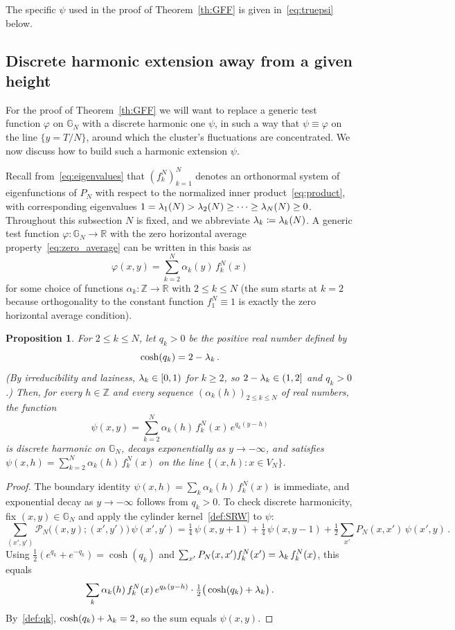 \documentclass[11pt,a4paper,reqno]{amsart}
\newtheorem{Proposition}[Theorem]{Proposition}
\theoremstyle{definition}
\newcommand{\cP}{\ensuremath{\mathcal P}}
\newcommand{\bbG}{{\ensuremath{\mathbb G}} }
\newcommand{\bbR}{{\ensuremath{\mathbb R}} }
\newcommand{\bbZ}{{\ensuremath{\mathbb Z}} }
\let\a=\alpha \let\b=\beta   \let\d=\delta  \let\e=\varepsilon
\begin{document}
The specific $\psi$ used in the proof of Theorem~\ref{th:GFF} is given in~\eqref{eq:truepsi} below.

\subsection{Discrete harmonic extension away from a given height}
For the proof of Theorem~\ref{th:GFF} we will want to replace a generic test function $\varphi$ on $\bbG_N$ with a discrete harmonic one $\psi$, in such a way that $\psi \equiv \varphi$ on the line $\{y = T/N\}$, around which the cluster's fluctuations are concentrated. We now discuss how to build such a harmonic extension $\psi$.  



Recall from~\eqref{eq:eigenvalues} that $(f_k^N)_{k=1}^N$ denotes an orthonormal system of eigenfunctions of $P_N$ with respect to the normalized inner product~\eqref{eq:product}, with corresponding eigenvalues $1 = \lambda_1(N) > \lambda_2(N) \geq \cdots \geq \lambda_N(N) \geq 0$. Throughout this subsection $N$ is fixed, and we abbreviate $\lambda_k \coloneqq \lambda_k(N)$. A generic test function $\varphi : \bbG_N \to \bbR$ with the zero horizontal average property~\eqref{eq:zero_average} can be written in this basis as
	\[
	\varphi(x, y) = \sum_{k=2}^N \a_k(y)\, f_k^N(x)
	\]
for some choice of functions $\alpha_k : \bbZ \to \bbR$ with $2 \leq k \leq N$ (the sum starts at $k = 2$ because orthogonality to the constant function $f_1^N \equiv 1$ is exactly the zero horizontal average condition).
\begin{Proposition} \label{pr:hextension}
For $2 \leq k \leq N$, let $q_k > 0$ be the positive real number defined by
	\begin{equation}\label{def:qk}
	 \cosh(q_k) = 2 - \lambda_k\,.
	 \end{equation}
(By irreducibility and laziness, $\lambda_k \in [0, 1)$ for $k \geq 2$, so $2 - \lambda_k \in (1, 2]$ and $q_k > 0$.) Then, for every $h \in \bbZ$ and every sequence $(\a_k(h))_{2 \leq k \leq N}$ of real numbers, the function
	\[ \psi(x, y) = \sum_{k=2}^N \a_k(h)\, f_k^N(x)\, e^{q_k(y - h)} \]
is discrete harmonic on $\bbG_N$, decays exponentially as $y \to -\infty$, and satisfies $\psi(x, h) = \sum_{k=2}^N \a_k(h)\,f_k^N(x)$ on the line $\{(x, h) : x \in V_N\}$.
\end{Proposition}

\begin{proof}
The boundary identity $\psi(x, h) = \sum_k \a_k(h)\,f_k^N(x)$ is immediate, and exponential decay as $y \to -\infty$ follows from $q_k > 0$. To check discrete harmonicity, fix $(x, y) \in \bbG_N$ and apply the cylinder kernel~\eqref{def:SRW} to $\psi$:
\[
	\sum_{(x', y')} \cP_N\big((x, y); (x', y')\big)\, \psi(x', y')
	= \tfrac{1}{4}\,\psi(x, y+1) + \tfrac{1}{4}\,\psi(x, y-1) + \tfrac{1}{2} \sum_{x'} P_N(x, x')\, \psi(x', y)\,.
\]
Using $\tfrac{1}{2}(e^{q_k} + e^{-q_k}) = \cosh(q_k)$ and $\sum_{x'} P_N(x, x') f_k^N(x') = \lambda_k\, f_k^N(x)$, this equals
\[
	\sum_k \a_k(h)\, f_k^N(x)\, e^{q_k(y - h)} \cdot \tfrac{1}{2}\big( \cosh(q_k) + \l_k \big)\,.
\]
By~\eqref{def:qk}, $\cosh(q_k) + \lambda_k = 2$, so the sum equals $\psi(x, y)$.
\end{proof}
\end{document}
